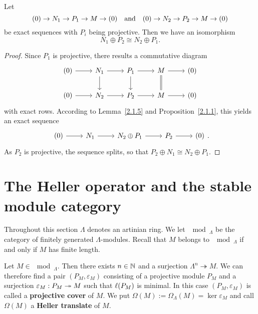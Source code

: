 
\begin{lemma}\label{2.1.6}
  Let
  \[
  (0) \to N_1 \to P_1 \to M \to (0) \quad\text{and}\quad (0) \to N_2 \to P_2 \to M \to (0)
  \]
  be exact sequences with $P_i$ being projective.
  Then we have an isomorphism \[N_1\oplus  P_2 \cong N_2 \oplus  P_1.\]
\end{lemma}


\begin{proof}
  Since $P_1$ is projective, there results a commutative diagram
  \[
    \begin{tikzcd}
      (0) \rar & N_1 \ar[d] \rar & P_1 \ar[d] \rar & M \ar[d, equal] \rar & (0)\\
      (0) \rar & N_2        \rar & P_2        \rar & M               \rar & (0)
    \end{tikzcd}
  \]
  with exact rows.
  According to Lemma~\ref{2.1.5} and Proposition~\ref{2.1.1}, this yields an exact sequence
   \[
     \begin{tikzcd}
       (0) \rar & N_1 \rar & N_2 \oplus  P_1 \rar & P_2 \rar & (0)
     \end{tikzcd}.
   \]
  As $P_2$ is projective, the sequence splits, so that $P_2\oplus N_1 \cong N_2\oplus  P_1$.
\end{proof}



\section{The Heller operator and the stable module category}


Throughout this section $\Lambda$ denotes an artinian ring. We let $\mod_\Lambda$ be the
category of finitely generated $\Lambda$-modules. Recall that $M$ belongs to $\mod_\Lambda$
if and only if $M$ has finite length.

Let $M \in \mod_\Lambda$. Then there exists $n \in \mathbb{N}$ and a surjection $\Lambda^n \twoheadrightarrow M$. 
We can therefore find a pair $(P_M,\varepsilon_M)$ consisting of a projective module $P_M$ and a surjection $\varepsilon_M: P_M \twoheadrightarrow M$ such that $\ell(P_M)$ is minimal. In this case $(P_M, \varepsilon_M)$ is called a \textbf{projective cover} of $M$. We put $\Omega(M) := \Omega_\Lambda(M) = \ker \varepsilon_M$ and call $\Omega(M)$ a \textbf{Heller translate} of $M$.

